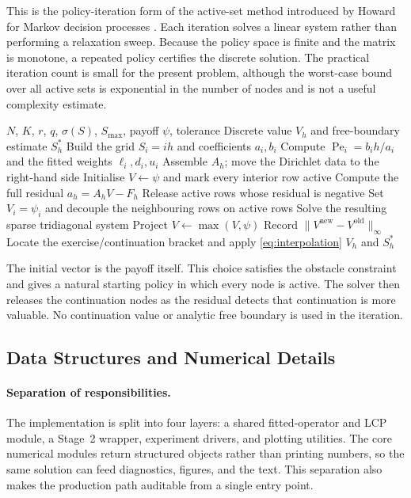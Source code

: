 \documentclass[11pt,a4paper]{article}
\theoremstyle{definition}
\theoremstyle{remark}
\begin{document}
This is the policy-iteration form of the active-set method introduced by
Howard for Markov decision processes \cite{ref7}. Each iteration solves a
linear system rather than performing a relaxation sweep. Because the policy
space is finite and the matrix is monotone, a repeated policy certifies the
discrete solution. The practical iteration count is small for the present
problem, although the worst-case bound over all active sets is exponential
in the number of nodes and is not a useful complexity estimate.

\begin{algorithm}[H]
\caption{Exponential-fitting LCP solved by policy iteration}
\label{alg:policy}
\begin{algorithmic}[1]
\Require $N$, $K$, $r$, $q$, $\sigma(S)$, $S_{\max}$, payoff $\psi$, tolerance
\Ensure Discrete value $V_h$ and free-boundary estimate $S_h^*$
\State Build the grid $S_i=ih$ and coefficients $a_i,b_i$
\State Compute $\operatorname{Pe}_i=b_ih/a_i$ and the fitted weights
       $\ell_i,d_i,u_i$
\State Assemble $A_h$; move the Dirichlet data to the right-hand side
\State Initialise $V\leftarrow\psi$ and mark every interior row active
\Repeat
    \State Compute the full residual $a_h=A_hV-F_h$
    \State Release active rows whose residual is negative
    \State Set $V_i=\psi_i$ and decouple the neighbouring rows on active rows
    \State Solve the resulting sparse tridiagonal system
    \State Project $V\leftarrow\max(V,\psi)$
    \State Record $\|V^{\mathrm{new}}-V^{\mathrm{old}}\|_\infty$
\State Locate the exercise/continuation bracket and apply
       \eqref{eq:interpolation}
\State \Return $V_h$ and $S_h^*$
\end{algorithmic}
\end{algorithm}

The initial vector is the payoff itself. This choice satisfies the obstacle
constraint and gives a natural starting policy in which every node is active.
The solver then releases the continuation nodes as the residual detects that
continuation is more valuable. No continuation value or analytic free
boundary is used in the iteration.

\subsection{Data Structures and Numerical Details}
\label{sec:implementation-details}

\paragraph{Separation of responsibilities.}
The implementation is split into four layers: a shared fitted-operator and
LCP module, a Stage~2 wrapper, experiment drivers, and plotting utilities.
The core numerical modules return structured objects rather than printing
numbers, so the same solution can feed diagnostics, figures, and the text.
This separation also makes the production path auditable from a single entry
point.
\end{document}
